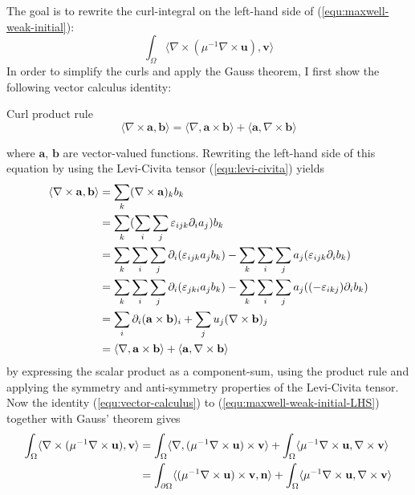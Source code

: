 \documentclass[11pt, a4paper]{article}
\begin{document}
The goal is to rewrite the curl-integral on the left-hand side of 
(\ref{equ:maxwell-weak-initial}):
\begin{equation}
    \int_{\Omega} \langle \nabla \times (\mu^{-1} \nabla \times \mathbf{u}), \mathbf{v} \rangle \label{equ:maxwell-weak-initial-LHS}
\end{equation}
In order to simplify the curls and apply the Gauss theorem, I first show
the following vector calculus identity:
\begin{fancybox}{Curl product rule}
    \begin{equation}
        \langle  \nabla \times \mathbf{a}, \mathbf{b} \rangle = \langle \nabla, \mathbf{a} \times \mathbf{b} \rangle + \langle \mathbf{a}, \nabla \times \mathbf{b} \rangle \label{equ:vector-calculus}
    \end{equation}
\end{fancybox}
where $\mathbf{a}$, $\mathbf{b}$ are vector-valued functions. Rewriting the 
left-hand side of this equation by using the Levi-Civita tensor (\ref{equ:levi-civita})
yields
\begin{align}
    \langle  \nabla \times \mathbf{a}, \mathbf{b} \rangle
    &= \sum_k (\nabla \times \mathbf{a})_k b_k \notag \\ 
    &= \sum_k (\sum_i \sum_j \varepsilon_{ijk} \partial_i a_j) b_k \notag \\ 
    &= \sum_k \sum_i \sum_j \partial_i (\varepsilon_{ijk} a_j b_k) - \sum_k \sum_i \sum_j a_j (\varepsilon_{ijk} \partial_i b_k) \notag \\ 
    &= \sum_k \sum_i \sum_j \partial_i (\varepsilon_{jki} a_j b_k) - \sum_k \sum_i \sum_j a_j ((-\varepsilon_{ikj}) \partial_i b_k) \notag \\ 
    &= \sum_i \partial_i (\mathbf{a} \times \mathbf{b})_i + \sum_j u_j (\nabla \times \mathbf{b})_j \notag \\ 
    &= \langle \nabla, \mathbf{a} \times \mathbf{b} \rangle + \langle \mathbf{a}, \nabla \times \mathbf{b} \rangle \label{equ:curlidentity} 
\end{align}
by expressing the scalar product as a component-sum, using the product rule and
applying the symmetry and anti-symmetry properties of the Levi-Civita tensor.
Now the identity (\ref{equ:vector-calculus}) to (\ref{equ:maxwell-weak-initial-LHS})
together with Gauss' theorem gives
\begin{align}
    \int_{\Omega} \langle \nabla \times ({\mu^{-1} \nabla \times \mathbf{u}}), \mathbf{v} \rangle &=
    \int_{\Omega} \langle \nabla, ({\mu^{-1} \nabla \times \mathbf{u}}) \times \mathbf{v} \rangle
    + \int_{\Omega} \langle {\mu^{-1} \nabla \times \mathbf{u}}, \nabla \times \mathbf{v} \rangle \notag \\
    &= \int_{\partial \Omega} \langle ({\mu^{-1} \nabla \times \mathbf{u}}) \times \mathbf{v}, \mathbf{n} \rangle
    + \int_{\Omega} \langle {\mu^{-1} \nabla \times \mathbf{u}}, \nabla \times \mathbf{v} \rangle \notag \\
\end{align}
\end{document}
